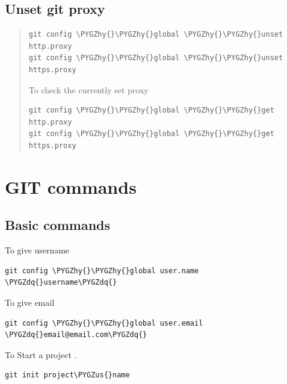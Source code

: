 \documentclass[letterpaper,10pt,english]{sphinxmanual}
\def\PYGZus{\char`\_}
\def\PYGZhy{\char`\-}
\def\PYGZdq{\char`\"}
\begin{document}
\subsection{Unset git proxy}
\label{_source/things/git_proxy:unset-git-proxy}\begin{quote}

\begin{Verbatim}[commandchars=\\\{\}]
git config \PYGZhy{}\PYGZhy{}global \PYGZhy{}\PYGZhy{}unset http.proxy
git config \PYGZhy{}\PYGZhy{}global \PYGZhy{}\PYGZhy{}unset https.proxy
\end{Verbatim}

To check the currently set proxy

\begin{Verbatim}[commandchars=\\\{\}]
git config \PYGZhy{}\PYGZhy{}global \PYGZhy{}\PYGZhy{}get http.proxy
git config \PYGZhy{}\PYGZhy{}global \PYGZhy{}\PYGZhy{}get https.proxy
\end{Verbatim}
\end{quote}


\section{GIT commands}
\label{_source/things/git_commands:git-commands}\label{_source/things/git_commands::doc}

\subsection{Basic commands}
\label{_source/things/git_commands:basic-commands}
To give username

\begin{Verbatim}[commandchars=\\\{\}]
git config \PYGZhy{}\PYGZhy{}global user.name \PYGZdq{}username\PYGZdq{}
\end{Verbatim}

To give email

\begin{Verbatim}[commandchars=\\\{\}]
git config \PYGZhy{}\PYGZhy{}global user.email \PYGZdq{}email@email.com\PYGZdq{}
\end{Verbatim}

To Start a project .

\begin{Verbatim}[commandchars=\\\{\}]
git init project\PYGZus{}name
\end{Verbatim}
\end{document}
